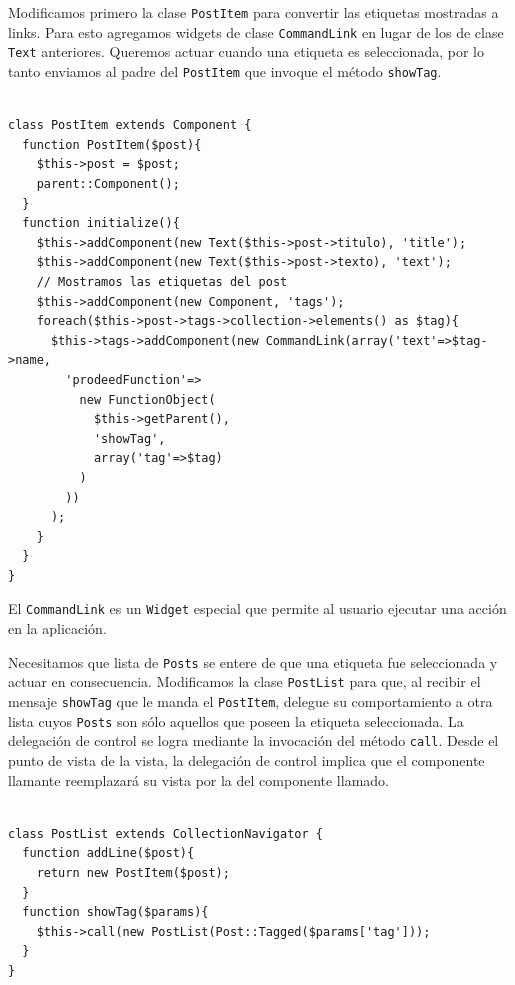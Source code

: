 Modificamos primero la clase \verb"PostItem" para convertir las etiquetas mostradas a links. Para esto agregamos widgets de clase \verb"CommandLink" en lugar de los de clase \verb"Text" anteriores. Queremos actuar cuando una etiqueta es seleccionada, por lo tanto enviamos al padre del \verb'PostItem' que invoque el método \verb'showTag'.

\begin{verbatim}

class PostItem extends Component {
  function PostItem($post){
    $this->post = $post;
    parent::Component();
  }
  function initialize(){
    $this->addComponent(new Text($this->post->titulo), 'title');
    $this->addComponent(new Text($this->post->texto), 'text');
    // Mostramos las etiquetas del post
    $this->addComponent(new Component, 'tags');
    foreach($this->post->tags->collection->elements() as $tag){
      $this->tags->addComponent(new CommandLink(array('text'=>$tag->name,
        'prodeedFunction'=>
          new FunctionObject(
            $this->getParent(),
            'showTag',
            array('tag'=>$tag)
          )
        ))
      );
    }
  }
}

\end{verbatim}

El \verb"CommandLink" es un \verb"Widget" especial que permite al usuario ejecutar una acción en la aplicación.

Necesitamos que lista de \verb"Posts" se entere de que una etiqueta fue seleccionada y actuar en consecuencia. Modificamos la clase \verb"PostList" para que, al recibir el mensaje \verb'showTag' que le manda el \verb'PostItem', delegue su comportamiento a otra lista cuyos \verb"Posts" son sólo aquellos que poseen la etiqueta seleccionada. La delegación de control se logra mediante la invocación del método \verb"call". Desde el punto de vista de la vista, la delegación de control implica que el componente llamante reemplazará su vista por la del componente llamado.

\begin{verbatim}

class PostList extends CollectionNavigator {
  function addLine($post){
    return new PostItem($post);
  }
  function showTag($params){
    $this->call(new PostList(Post::Tagged($params['tag']));
  }
}

\end{verbatim}


